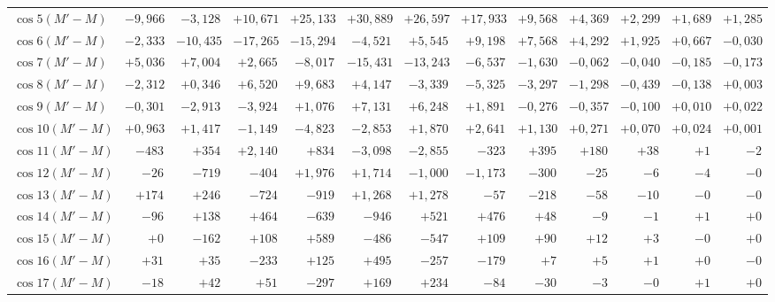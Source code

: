 \begin{landscape}
\begin{longtable}{@{}l|r|r|r|r|r|r|r|r|r|r|r|r@{}}
\(\cos 5(M'-M)\) & \(-9{,}966\) & \(-3{,}128\) & \(+10{,}671\) & \(+25{,}133\) & \(+30{,}889\) & \(+26{,}597\) & \(+17{,}933\) & \(+9{,}568\) & \(+4{,}369\) & \(+2{,}299\) & \(+1{,}689\) & \(+1{,}285\)\\
\(\cos 6(M'-M)\) & \(-2{,}333\) & \(-10{,}435\) & \(-17{,}265\) & \(-15{,}294\) & \(-4{,}521\) & \(+5{,}545\) & \(+9{,}198\) & \(+7{,}568\) & \(+4{,}292\) & \(+1{,}925\) & \(+0{,}667\) & \(-0{,}030\)\\
\(\cos 7(M'-M)\) & \(+5{,}036\) & \(+7{,}004\) & \(+2{,}665\) & \(-8{,}017\) & \(-15{,}431\) & \(-13{,}243\) & \(-6{,}537\) & \(-1{,}630\) & \(-0{,}062\) & \(-0{,}040\) & \(-0{,}185\) & \(-0{,}173\)\\
\(\cos 8(M'-M)\) & \(-2{,}312\) & \(+0{,}346\) & \(+6{,}520\) & \(+9{,}683\) & \(+4{,}147\) & \(-3{,}339\) & \(-5{,}325\) & \(-3{,}297\) & \(-1{,}298\) & \(-0{,}439\) & \(-0{,}138\) & \(+0{,}003\)\\
\(\cos 9(M'-M)\) & \(-0{,}301\) & \(-2{,}913\) & \(-3{,}924\) & \(+1{,}076\) & \(+7{,}131\) & \(+6{,}248\) & \(+1{,}891\) & \(-0{,}276\) & \(-0{,}357\) & \(-0{,}100\) & \(+0{,}010\) & \(+0{,}022\)\\
\(\cos 10(M'-M)\) & \(+0{,}963\) & \(+1{,}417\) & \(-1{,}149\) & \(-4{,}823\) & \(-2{,}853\) & \(+1{,}870\) & \(+2{,}641\) & \(+1{,}130\) & \(+0{,}271\) & \(+0{,}070\) & \(+0{,}024\) & \(+0{,}001\)\\
\(\cos 11(M'-M)\) & \(-483\) & \(+354\) & \(+2{,}140\) & \(+834\) & \(-3{,}098\) & \(-2{,}855\) & \(-323\) & \(+395\) & \(+180\) & \(+38\) & \(+1\) & \(-2\)\\
\(\cos 12(M'-M)\) & \(-26\) & \(-719\) & \(-404\) & \(+1{,}976\) & \(+1{,}714\) & \(-1{,}000\) & \(-1{,}173\) & \(-300\) & \(-25\) & \(-6\) & \(-4\) & \(-0\)\\
\(\cos 13(M'-M)\) & \(+174\) & \(+246\) & \(-724\) & \(-919\) & \(+1{,}268\) & \(+1{,}278\) & \(-57\) & \(-218\) & \(-58\) & \(-10\) & \(-0\) & \(-0\)\\
\(\cos 14(M'-M)\) & \(-96\) & \(+138\) & \(+464\) & \(-639\) & \(-946\) & \(+521\) & \(+476\) & \(+48\) & \(-9\) & \(-1\) & \(+1\) & \(+0\)\\
\(\cos 15(M'-M)\) & \(+0\) & \(-162\) & \(+108\) & \(+589\) & \(-486\) & \(-547\) & \(+109\) & \(+90\) & \(+12\) & \(+3\) & \(-0\) & \(+0\)\\
\(\cos 16(M'-M)\) & \(+31\) & \(+35\) & \(-233\) & \(+125\) & \(+495\) & \(-257\) & \(-179\) & \(+7\) & \(+5\) & \(+1\) & \(+0\) & \(-0\)\\
\(\cos 17(M'-M)\) & \(-18\) & \(+42\) & \(+51\) & \(-297\) & \(+169\) & \(+234\) & \(-84\) & \(-30\) & \(-3\) & \(-0\) & \(+1\) & \(+0\)\\

\end{longtable}
\end{landscape}

